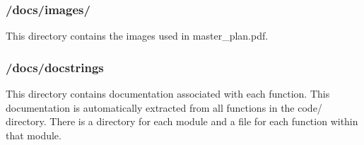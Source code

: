 \subsubsection{{\ttfamily /docs/images/}}
This directory contains the images used in master\_plan.pdf.
\subsubsection{{\ttfamily /docs/docstrings}}
This directory contains documentation associated with each function. This documentation is automatically extracted from all functions in the {\ttfamily code/} directory. There is a directory for each module and a file for each function within that module.